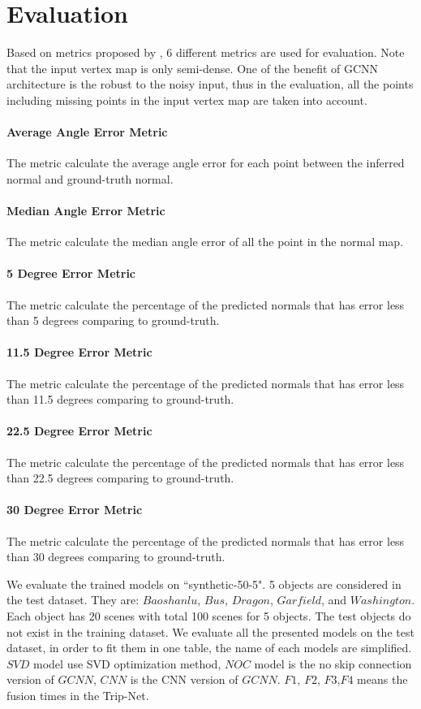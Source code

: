 \documentclass[border=15pt, multi, tikz]{article}
\begin{document}
\section{Evaluation}

Based on metrics proposed by \cite{geometry_based_solution}, 6 different metrics are used for evaluation. Note that the input vertex map is only semi-dense. One of the benefit of GCNN architecture is the robust to the noisy input, thus in the evaluation, all the points including missing points in the input vertex map are taken into account. 

\paragraph{Average Angle Error Metric}
The metric calculate the average angle error for each point between the inferred normal and ground-truth normal. 
\paragraph{Median Angle Error Metric}
The metric calculate the median angle error of all the point in the normal map.
\paragraph{5 Degree Error Metric}
The metric calculate the percentage of the predicted normals that has error less than 5 degrees comparing to ground-truth.
\paragraph{11.5 Degree Error Metric}
The metric calculate the percentage of the predicted normals that has error less than 11.5 degrees comparing to ground-truth.
\paragraph{22.5 Degree Error Metric}
The metric calculate the percentage of the predicted normals that has error less than 22.5 degrees comparing to ground-truth.
\paragraph{30 Degree Error Metric}
The metric calculate the percentage of the predicted normals that has error less than 30 degrees comparing to ground-truth.

We evaluate the trained models on ``synthetic-50-5". 5 objects are considered in the test dataset. They are: $ Baoshanlu $, $ Bus $, $ Dragon $, $ Garfield $, and $ Washington $. Each object has 20 scenes with total 100 scenes for 5 objects. The test objects do not exist in the training dataset. We evaluate all the presented models on the test dataset, in order to fit them in one table, the name of each models are simplified. $ SVD $ model use SVD optimization method, $ NOC $ model is the no skip connection version of $ GCNN $, $ CNN $ is the CNN version of $ GCNN $. $ F1 $, $ F2 $, $ F3 $,$ F4 $ means the fusion times in the Trip-Net. 
\end{document}
